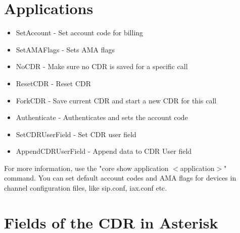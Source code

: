 \section{Applications}

\begin{itemize}
    \item SetAccount - Set account code for billing
    \item SetAMAFlags - Sets AMA flags
    \item NoCDR - Make sure no CDR is saved for a specific call
    \item ResetCDR - Reset CDR
    \item ForkCDR - Save current CDR and start a new CDR for this call
    \item Authenticate - Authenticates and sets the account code
    \item SetCDRUserField - Set CDR user field
    \item AppendCDRUserField - Append data to CDR User field
\end{itemize}

For more information, use the "core show application $<$application$>$" command.
You can set default account codes and AMA flags for devices in
channel configuration files, like sip.conf, iax.conf etc.

\section{Fields of the CDR in Asterisk}

